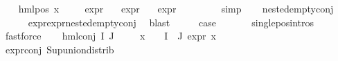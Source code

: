 \begin{isabellebody}
\isamarkupfalse%
\isanewline
\ \ \isamarkupfalse%
\ {\isacharparenleft}{\kern0pt}hml{\isacharunderscore}{\kern0pt}pos\ x{}\ {\isasymphi}{\isacharparenright}{\kern0pt}\isanewline
\ \ \isamarkupfalse%
\ {\isachardoublequoteopen}expr{\isacharunderscore}{\kern0pt}{}\ {\isasymphi}\ {\isasymle}\ {}{\isachardoublequoteclose}\isanewline
{\isachardoublequoteopen}expr{\isacharunderscore}{\kern0pt}{}\ {\isasymphi}\ {\isasymle}\ {}{\isachardoublequoteclose}\isanewline
{\isachardoublequoteopen}expr{\isacharunderscore}{\kern0pt}{}\ {\isasymphi}\ {\isasymle}\ {}{\isachardoublequoteclose}\isanewline
\ \ \ \ \isamarkupfalse%
\ simp{\isacharplus}{\kern0pt}\isanewline
\ \ \isamarkupfalse%
\ {\isachardoublequoteopen}nested{\isacharunderscore}{\kern0pt}empty{\isacharunderscore}{\kern0pt}conj\ {\isasymphi}{\isachardoublequoteclose}\isanewline
\ \ \ \ \isamarkupfalse%
\ expr{\isacharunderscore}{\kern0pt}{}{\isacharunderscore}{\kern0pt}{}{\isacharunderscore}{\kern0pt}expr{\isacharunderscore}{\kern0pt}{}{\isacharunderscore}{\kern0pt}{}{\isacharunderscore}{\kern0pt}nested{\isacharunderscore}{\kern0pt}empty{\isacharunderscore}{\kern0pt}conj\ \isamarkupfalse%
\ blast\isanewline
\ \ \isamarkupfalse%
\ \isamarkupfalse%
\ {\isacharquery}{\kern0pt}case\ \isanewline
\ \ \ \ \isamarkupfalse%
\ single{\isacharunderscore}{\kern0pt}pos{\isachardot}{\kern0pt}intros{\isacharparenleft}{\kern0pt}{}{\isacharparenright}{\kern0pt}\ \isanewline
\ \ \ \ \isamarkupfalse%
\ fastforce\isanewline
{}\isamarkupfalse%
\isanewline
\ \ \isamarkupfalse%
\ {\isacharparenleft}{\kern0pt}hml{\isacharunderscore}{\kern0pt}conj\ I\ J\ {\isasymPhi}{\isacharparenright}{\kern0pt}\isanewline
\ \ \isamarkupfalse%
\ {\isachardoublequoteopen}{\isasymforall}x\ {\isasymin}\ {\isacharparenleft}{\kern0pt}{\isasymPhi}\ {\isacharbackquote}{\kern0pt}\ {\isacharparenleft}{\kern0pt}I\ {\isasymunion}\ J{\isacharparenright}{\kern0pt}{\isacharparenright}{\kern0pt}{\isachardot}{\kern0pt}\ expr{\isacharunderscore}{\kern0pt}{}\ x\ {\isasymle}\ {}{\isachardoublequoteclose}\isanewline
\ \ \ \ \isamarkupfalse%
\ expr{\isacharunderscore}{\kern0pt}{}{\isacharunderscore}{\kern0pt}conj\ Sup{\isacharunderscore}{\kern0pt}union{\isacharunderscore}{\kern0pt}distrib\isanewline

\end{isabellebody}
